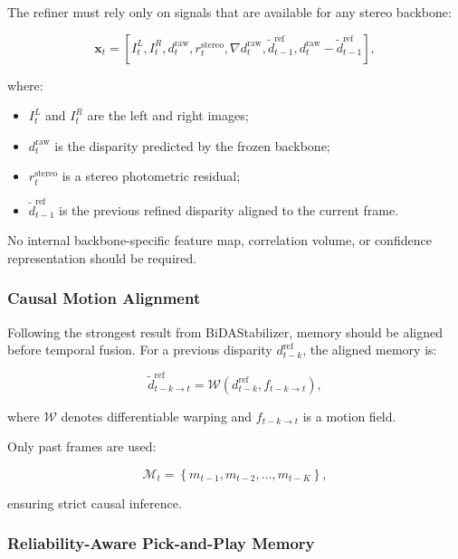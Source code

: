 \documentclass[11pt,a4paper]{article}
\begin{document}
The refiner must rely only on signals that are available for any stereo backbone:

\begin{equation}
\mathbf{x}_t
=
\left[
I_t^L,
I_t^R,
d_t^{\mathrm{raw}},
r_t^{\mathrm{stereo}},
\nabla d_t^{\mathrm{raw}},
\tilde{d}_{t-1}^{\mathrm{ref}},
d_t^{\mathrm{raw}}
-
\tilde{d}_{t-1}^{\mathrm{ref}}
\right],
\end{equation}

where:

\begin{itemize}
    \item $I_t^L$ and $I_t^R$ are the left and right images;
    \item $d_t^{\mathrm{raw}}$ is the disparity predicted by the frozen backbone;
    \item $r_t^{\mathrm{stereo}}$ is a stereo photometric residual;
    \item $\tilde{d}_{t-1}^{\mathrm{ref}}$ is the previous refined disparity aligned to the current frame.
\end{itemize}

No internal backbone-specific feature map, correlation volume, or confidence representation should be required.

\subsubsection{Causal Motion Alignment}

Following the strongest result from BiDAStabilizer, memory should be aligned before temporal fusion. For a previous disparity $d_{t-k}^{\mathrm{ref}}$, the aligned memory is:

\begin{equation}
\tilde{d}_{t-k \rightarrow t}^{\mathrm{ref}}
=
\mathcal{W}
\left(
d_{t-k}^{\mathrm{ref}},
f_{t-k \rightarrow t}
\right),
\end{equation}

where $\mathcal{W}$ denotes differentiable warping and $f_{t-k \rightarrow t}$ is a motion field.

Only past frames are used:

\begin{equation}
\mathcal{M}_t
=
\left\{
m_{t-1},
m_{t-2},
\dots,
m_{t-K}
\right\},
\end{equation}

ensuring strict causal inference.

\subsubsection{Reliability-Aware Pick-and-Play Memory}
\end{document}
